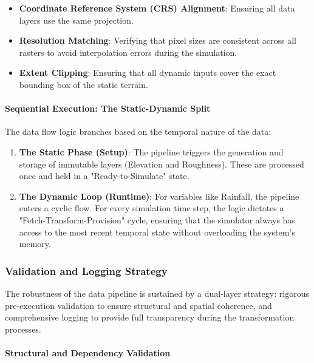 \begin{itemize}
    \item \textbf{Coordinate Reference System (CRS) Alignment}: Ensuring all data layers use the same 
    projection.
    \item \textbf{Resolution Matching}: Verifying that pixel sizes are consistent across all rasters to avoid 
    interpolation errors during the simulation.
    \item \textbf{Extent Clipping}: Ensuring that all dynamic inputs cover the exact bounding box of the 
    static terrain.
\end{itemize}


\paragraph{Sequential Execution: The Static-Dynamic Split}

The data flow logic branches based on the temporal nature of the data:

\begin{enumerate}
    \item \textbf{The Static Phase (Setup)}: The pipeline triggers the generation and storage of immutable 
    layers (Elevation and Roughness). These are processed once and held in a "Ready-to-Simulate" state.
    \item \textbf{The Dynamic Loop (Runtime)}: For variables like Rainfall, the pipeline enters a cyclic flow. 
    For every simulation time step, the logic dictates a "Fetch-Transform-Provision" cycle, ensuring that the 
    simulator always has access to the most recent temporal state without overloading the system's memory.
\end{enumerate}


\subsubsection{Validation and Logging Strategy}

The robustness of the data pipeline is sustained by a dual-layer strategy: rigorous pre-execution validation 
to ensure structural and spatial coherence, and comprehensive logging to provide full transparency during the 
transformation processes.


\paragraph{Structural and Dependency Validation}

